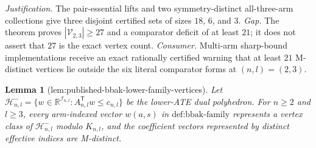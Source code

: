 \documentclass{article}
\newtheorem{lemma}{Lemma}
\begin{document}
\par\smallskip\noindent \textit{Justification.} The pair-essential lifts and two symmetry-distinct all-three-arm collections give three disjoint certified sets of sizes \(18\), \(6\), and \(3\). \textit{Gap.} The theorem proves \(|\mathcal V_{2,3}|\ge27\) and a comparator deficit of at least \(21\); it does not assert that \(27\) is the exact vertex count. \textit{Consumer.} Multi-arm sharp-bound implementations receive an exact rationally certified warning that at least \(21\) M-distinct vertices lie outside the six literal comparator forms at \((n,l)=(2,3)\).

\begin{lemma}[lem:published-bbak-lower-family-vertices]\label{lem:published-bbak-lower-family-vertices}
Let \(\mathcal H^-_{n,l}=\{w\in\mathbb R^{\mathcal I_{n,l}}:A_{n,l}^{\mathsf T}w\le c_{n,l}\}\) be the lower-ATE dual polyhedron. For \(n\ge2\) and \(l\ge3\), every arm-indexed vector \(w(a,s)\) in \(\text{def:bbak-family}\) represents a vertex class of \(\mathcal H^-_{n,l}\) modulo \(K_{n,l}\), and the coefficient vectors represented by distinct effective indices are M-distinct.
\end{lemma}
\end{document}
